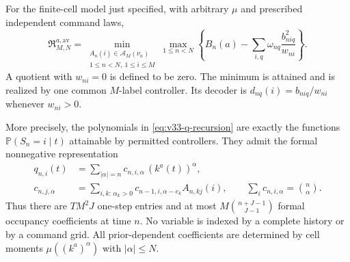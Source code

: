 \begin{theorem}
\label{thm:v33-moment-program}
For the finite-cell model just specified, with arbitrary $\mu$ and
prescribed independent command laws,
\begin{equation}\label{eq:v33-exact-value}
 \mathfrak R_{M,N}^{a,\mathrm{av}}
  =\min_{\substack{A_n(i)\in\mathscr A_M(\nu_n)\\1\le n<N,\ 1\le i\le M}}
       \max_{1\le n<N}
       \left\{B_n(a)-\sum_{i,q}\omega_{nq}
                        \frac{b_{niq}^2}{w_{ni}}\right\}.
\end{equation}
A quotient with $w_{ni}=0$ is defined to be zero. The minimum is
attained and is realized by one common $M$-label controller. Its decoder
is $d_{nq}(i)=b_{niq}/w_{ni}$ whenever $w_{ni}>0$.

More precisely, the polynomials in \eqref{eq:v33-q-recursion} are
exactly the functions
$\mathbb P(S_n=i\mid t)$ attainable by permitted controllers. They
admit the formal nonnegative representation
\begin{equation}\label{eq:v33-formal-recursion}
 \begin{split}
 q_{n,i}(t)&=\sum_{|\alpha|=n}c_{n,i,\alpha}\,(k^a(t))^\alpha,\\
 c_{n,j,\alpha}
    &=\sum_{i,k:\,\alpha_k>0}
          c_{n-1,i,\alpha-e_k}A_{n,kj}(i),\qquad
 \sum_i c_{n,i,\alpha}=\binom n\alpha.
 \end{split}
\end{equation}
Thus there are $TM^2J$ one-step entries and at most
$M\binom{n+J-1}{J-1}$ formal occupancy coefficients at time $n$.
No variable is indexed by a complete history or by a command grid.
All prior-dependent coefficients are determined by cell moments
$\mu((k^a)^\alpha)$ with $|\alpha|\le N$.
\end{theorem}
